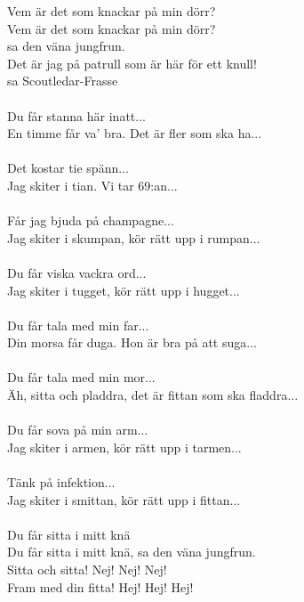 \vspace{10pt}
\revrpt Vem är det som knackar på min dörr?\rpt\\
Vem är det som knackar på min dörr?\\
sa den väna jungfrun.\\
\revrpt Det är jag på patrull som är här för ett knull!\\
sa Scoutledar-Frasse\rpt\\
\\
Du får stanna här inatt...\\
En timme får va' bra. Det är fler som ska ha...\\
\\
Det kostar tie spänn...\\
Jag skiter i tian. Vi tar 69:an...\\
\\
Får jag bjuda på champagne...\\
Jag skiter i skumpan, kör rätt upp i rumpan...\\
\\
Du får viska vackra ord...\\
Jag skiter i tugget, kör rätt upp i hugget...\\
\\
Du får tala med min far...\\
Din morsa får duga. Hon är bra på att suga...\\
\\
Du får tala med min mor...\\
Äh, sitta och pladdra, det är fittan som ska fladdra...\\
\\
Du får sova på min arm...\\
Jag skiter i armen, kör rätt upp i tarmen...\\
\\
Tänk på infektion...\\
Jag skiter i smittan, kör rätt upp i fittan...\\
\\
\revrpt Du får sitta i mitt knä\rpt\\
Du får sitta i mitt knä, sa den väna jungfrun.\\
Sitta och sitta! Nej! Nej! Nej!\\
Fram med din fitta! Hej! Hej! Hej!

